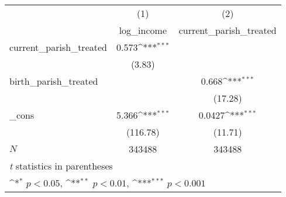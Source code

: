 {
\def\sym#1{\ifmmode^{#1}\else\(^{#1}\)\fi}
\begin{tabular}{l*{2}{c}}
\hline\hline
            &\multicolumn{1}{c}{(1)}&\multicolumn{1}{c}{(2)}\\
            &\multicolumn{1}{c}{log\_income}&\multicolumn{1}{c}{current\_parish\_treated}\\
\hline
current\_parish\_treated&       0.573\sym{***}&                     \\
            &      (3.83)         &                     \\
[1em]
birth\_parish\_treated&                     &       0.668\sym{***}\\
            &                     &     (17.28)         \\
[1em]
\_cons      &       5.366\sym{***}&      0.0427\sym{***}\\
            &    (116.78)         &     (11.71)         \\
\hline
\(N\)       &      343488         &      343488         \\
\hline\hline
\multicolumn{3}{l}{\footnotesize \textit{t} statistics in parentheses}\\
\multicolumn{3}{l}{\footnotesize \sym{*} \(p<0.05\), \sym{**} \(p<0.01\), \sym{***} \(p<0.001\)}\\
\end{tabular}
}
